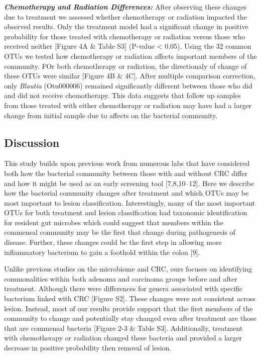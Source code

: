 \documentclass[12pt,]{article}
\begin{document}
\textbf{\emph{Chemotherapy and Radiation Differences:}} After observing
these changes due to treatment we assessed whether chemotherapy or
radiation impacted the observed results. Only the treatment model had a
significant change in positive probability for those treated with
chemotherapy or radiation versus those who received neither {[}Figure 4A
\& Table S3{]} (P-value \textless{} 0.05). Using the 32 common OTUs we
tested how chemotherapy or radiation affects important members of the
community. FOr both chemotherapy or radiation, the directionaly of
change of these OTUs were similar {[}Figure 4B \& 4C{]}. After multiple
comparison correction, only \emph{Blautia} (Otu000006) remained
significantly different between those who did and did not receive
chemotherapy. This data suggests that follow up samples from those
treated with either chemotherapy or radiation may have had a larger
change from initial sample due to affects on the bacterial community.

\newpage

\subsection{Discussion}\label{discussion}

This study builds upon previous work from numerous labs that have
considered both how the bacterial community between those with and
without CRC differ and how it might be used as an early screening tool
{[}7,8,10--12{]}. Here we describe how the bacterial community changes
after treatment and which OTUs may be most important to lesion
classification. Interestingly, many of the most important OTUs for both
treatment and lesion classification had taxonomic identification for
resident gut microbes which could suggest that members within the
commensal community may be the first that change during pathogenesis of
disease. Further, these changes could be the first step in allowing more
inflammatory bacterium to gain a foothold within the colon {[}9{]}.

Unlike previous studies on the microbiome and CRC, ours focuses on
identifying commonalities within both adenoma and carcinoma groups
before and after treatment. Although there were differences for genera
associated with specific bacterium linked with CRC {[}Figure S2{]}.
These changes were not consistent across lesion. Instead, most of our
results provide support that the first members of the community to
change and potentially stay changed even after treatment are those that
are commensal bacteria {[}Figure 2-3 \& Table S3{]}. Additionally,
treatment with chemotherapy or radiation changed these bacteria and
provided a larger decrease in positive probability then removal of
lesion.
\end{document}

